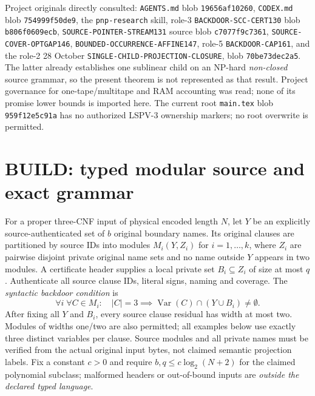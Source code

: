 \documentclass[11pt]{article}
\begin{document}
Project originals directly consulted: \texttt{AGENTS.md} blob \texttt{19656af10260}, \texttt{CODEX.md} blob \texttt{754999f50de9}, the \texttt{pnp-research} skill, role-3 \texttt{BACKDOOR-SCC-CERT130} blob \texttt{b806f0609ecb}, \texttt{SOURCE-POINTER-STREAM131} source blob \texttt{c7077f9c7361}, \texttt{SOURCE-COVER-OPTGAP146}, \texttt{BOUNDED-OCCURRENCE-AFFINE147}, role-5 \texttt{BACKDOOR-CAP161}, and the role-2 28 October \texttt{SINGLE-CHILD-PROJECTION-CLOSURE}, blob \texttt{70be73dec2a5}. The latter already establishes one sublinear child on an NP-hard \emph{non-closed} source grammar, so the present theorem is not represented as that result. Project governance for one-tape/multitape and RAM accounting was read; none of its promise lower bounds is imported here. The current root \texttt{main.tex} blob \texttt{959f12e5c91a} has no authorized LSPV-3 ownership markers; no root overwrite is permitted.

\section{BUILD: typed modular source and exact grammar}
For a proper three-CNF input of physical encoded length $N$, let $Y$ be an explicitly source-authenticated set of $b$ original boundary names. Its original clauses are partitioned by source IDs into modules $M_i(Y,Z_i)$ for $i=1,\ldots,k$, where $Z_i$ are pairwise disjoint private original name sets and no name outside $Y$ appears in two modules. A certificate header supplies a local private set $B_i\subseteq Z_i$ of size at most $q$. Authenticate all source clause IDs, literal signs, naming and coverage. The \emph{syntactic backdoor condition} is
\begin{equation}\label{eq:hit}
\forall i\;\forall C\in M_i:\quad |C|=3\implies \operatorname{Var}(C)\cap(Y\cup B_i)\ne\emptyset.
\end{equation}
After fixing all $Y$ and $B_i$, every source clause residual has width at most two. Modules of widths one/two are also permitted; all examples below use exactly three distinct variables per clause. Source modules and all private names must be verified from the actual original input bytes, not claimed semantic projection labels. Fix a constant $c>0$ and require $b,q\le c\log_2(N+2)$ for the claimed polynomial subclass; malformed headers or out-of-bound inputs are \emph{outside the declared typed language}.
\end{document}
